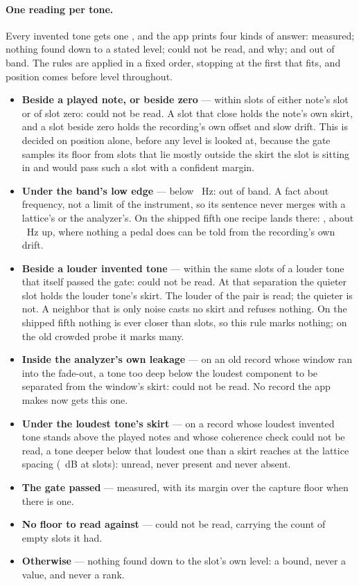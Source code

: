 \documentclass[11pt,a4paper]{article}
\begin{document}
\paragraph{One reading per tone.} Every invented tone gets one
, and the app prints four kinds of answer: measured;
nothing found down to a stated level; could not be read, and why; and out
of band. The rules are applied in a fixed order, stopping at the first
that fits, and position comes before level throughout.
\begin{itemize}
  \item \textbf{Beside a played note, or beside zero} --- within
  \imdNeighbourhoodBins{} slots of either note's slot or of slot zero:
  could not be read. A slot that close holds the note's own skirt, and a
  slot beside zero holds the recording's own offset and slow drift. This
  is decided on position alone, before any level is looked at, because
  the gate samples its floor from slots that lie mostly outside the skirt
  the slot is sitting in and would pass such a slot with a confident
  margin.
  \item \textbf{Under the band's low edge} --- below \imdAudibleLowHz{}~Hz:
  out of band. A fact about frequency, not a limit of the instrument, so
  its sentence never merges with a lattice's or the analyzer's. On the
  shipped fifth one recipe lands there: \imdSubBandRecipe{}, about
  \imdSubBandHz{}~Hz up, where nothing a pedal does can be told from the
  recording's own drift.
  \item \textbf{Beside a louder invented tone} --- within the same
  \imdNeighbourhoodBins{} slots of a louder tone that itself passed the
  gate: could not be read. At that separation the quieter slot holds the
  louder tone's skirt. The louder of the pair is read; the quieter is not.
  A neighbor that is only noise casts no skirt and refuses nothing. On
  the shipped fifth nothing is ever closer than \imdClassASpacing{} slots,
  so this rule marks nothing; on the old crowded probe it marks many.
  \item \textbf{Inside the analyzer's own leakage} --- on an old record
  whose window ran into the fade-out, a tone too deep below the loudest
  component to be separated from the window's skirt: could not be read.
  No record the app makes now gets this one.
  \item \textbf{Under the loudest tone's skirt} --- on a record whose
  loudest invented tone stands above the played notes and whose
  coherence check could not be read, a tone deeper below that loudest
  one than a skirt reaches at the lattice spacing
  (\imdClassASkirtDepthDB{}~dB at \imdClassASpacing{} slots): unread,
  never present and never absent.
  \item \textbf{The gate passed} --- measured, with its margin over the
  capture floor when there is one.
  \item \textbf{No floor to read against} --- could not be read, carrying
  the count of empty slots it had.
  \item \textbf{Otherwise} --- nothing found down to the slot's own level:
  a bound, never a value, and never a rank.
\end{itemize}
\end{document}
